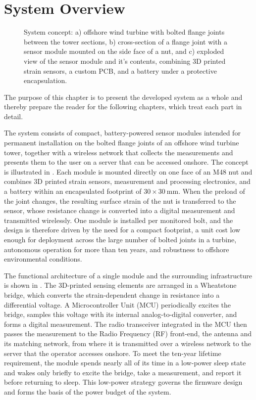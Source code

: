 \chapter{System Overview} \label{sec:System_overview}

\begin{figure}[!b]
\centering

    \caption{System concept: a) offshore wind turbine with bolted flange joints between the tower sections, b) cross-section of a flange joint with a sensor module mounted on the side face of a nut, and c) exploded view of the sensor module and it's contents, combining 3D printed strain sensors, a custom PCB, and a battery under a protective encapsulation.}
    \label{fig:System_concept}
\end{figure}

The purpose of this chapter is to present the developed system as a whole and thereby prepare the reader for the following chapters, which treat each part in detail.

The system consists of compact, battery-powered sensor modules intended for permanent installation on the bolted flange joints of an offshore wind turbine tower, together with a wireless network that collects the measurements and presents them to the user on a server that can be accessed onshore. 
The concept is illustrated in . Each module is mounted directly on one face of an M48 nut and combines 3D printed strain sensors, measurement and processing electronics, and a battery within an encapsulated footprint of $30 \times \SI{30}{\milli\meter}$. When the preload of the joint changes, the resulting surface strain of the nut is transferred to the sensor, whose resistance change is converted into a digital measurement and transmitted wirelessly.
One module is installed per monitored bolt, and the design is therefore driven by the need for a compact footprint, a unit cost low enough for deployment across the large number of bolted joints in a turbine, autonomous operation for more than ten years, and robustness to offshore environmental conditions.

The functional architecture of a single module and the surrounding infrastructure is shown in . 
The 3D-printed sensing elements are arranged in a Wheatstone bridge, which converts the strain-dependent change in resistance into a differential voltage. 
A Microcontroller Unit (MCU) periodically excites the bridge, samples this voltage with its internal analog-to-digital converter, and forms a digital measurement. The radio transceiver integrated in the MCU then passes the measurement to the Radio Frequency (RF) front-end, the antenna and its matching network, from where it is transmitted over a wireless network to the server that the operator accesses onshore.
To meet the ten-year lifetime requirement, the module spends nearly all of its time in a low-power sleep state and wakes only briefly to excite the bridge, take a measurement, and report it before returning to sleep. This low-power strategy governs the firmware design and forms the basis of the power budget of the system.

